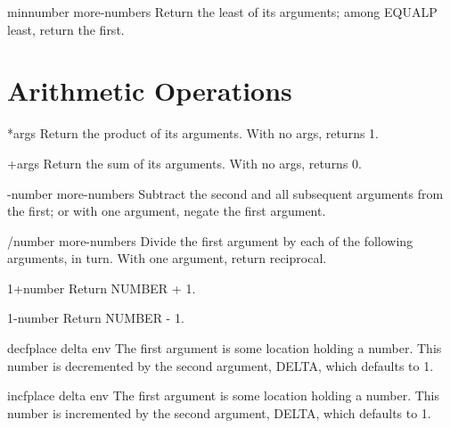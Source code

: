 \begin{function}{min}{number \rest more-numbers}{}{}
  Return the least of its arguments; among EQUALP least, return
the first.
\end{function}

\section{Arithmetic Operations}
\label{sec:arithm-oper}

\begin{function}{*}{\rest args}{}{}
  Return the product of its arguments. With no args, returns 1.
\end{function}

\begin{function}{+}{\rest args}{}{}
  Return the sum of its arguments. With no args, returns 0.
\end{function}

\begin{function}{-}{number \rest more-numbers}{}{}
  Subtract the second and all subsequent arguments from the first;
  or with one argument, negate the first argument.
\end{function}

\begin{function}{/}{number \rest more-numbers}{}{}
  Divide the first argument by each of the following arguments, in turn.
  With one argument, return reciprocal.
\end{function}

\begin{function}{1+}{number}{}{}
  Return NUMBER + 1.
\end{function}

\begin{function}{1-}{number}{}{}
  Return NUMBER - 1.
\end{function}

\begin{macro}{decf}{place \op delta \env env}{}{}
  The first argument is some location holding a number. This number is
  decremented by the second argument, DELTA, which defaults to 1.
\end{macro}

\begin{macro}{incf}{place \op delta \env env}{}{}
  The first argument is some location holding a number. This number is
  incremented by the second argument, DELTA, which defaults to 1.
\end{macro}

